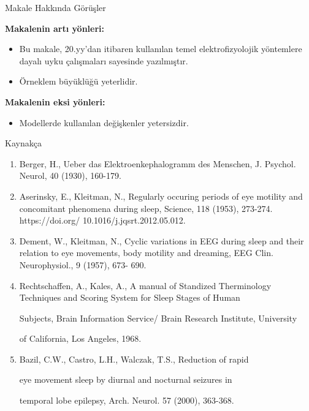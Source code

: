 \documentclass {beamer}
\begin{document}
\begin{frame}{Makale Hakkında Görüşler}

\textbf{Makalenin artı yönleri:}
\begin{itemize}
    \item Bu makale, 20.yy'dan itibaren kullanılan temel elektrofizyolojik yöntemlere dayalı uyku çalışmaları sayesinde yazılmıştır.
    \item Örneklem büyüklüğü yeterlidir.
    
\end{itemize}

\textbf{Makalenin eksi yönleri:}
\begin{itemize}
    \item Modellerde kullanılan değişkenler yetersizdir. 
\end{itemize}
\end{frame}
\begin{frame}{Kaynakça}
\begin{enumerate}
    \item Berger, H., Ueber das Elektroenkephalogramm des Menschen, J. Psychol. Neurol, 40 
(1930), 160-179. 
\item Aserinsky, E., Kleitman, N., Regularly occuring periods of eye motility and 
concomitant phenomena  during sleep, Science, 118 (1953), 273-274. https://doi.org/ 
10.1016/j.jqsrt.2012.05.012. 
\item Dement, W., Kleitman, N., Cyclic variations in EEG during sleep and their relation to 
eye movements, body motility and dreaming, EEG Clin. Neurophysiol., 9 (1957), 673-
690.  
\item Rechtschaffen, A., Kales, A., A manual of Standized Therminology Techniques and 
Scoring  System  for  Sleep  Stages  of  Human  

Subjects, 
Brain  Information  Service/ 
Brain Research Institute, University

of California, Los Angeles, 1968. 
\item Bazil, C.W., Castro, L.H., Walczak, T.S., Reduction of rapid

eye movement sleep by 
diurnal  and  nocturnal  seizures  in  

temporal  lobe  epilepsy,  Arch.  Neurol.  57  (2000), 
363-368. 

\end{enumerate}



\end{frame}
\end{document}
